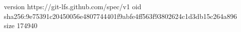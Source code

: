 version https://git-lfs.github.com/spec/v1
oid sha256:9e75391c20450056e4807744401f9abfe4ff563f93802624c1d3db15c264a896
size 174940
